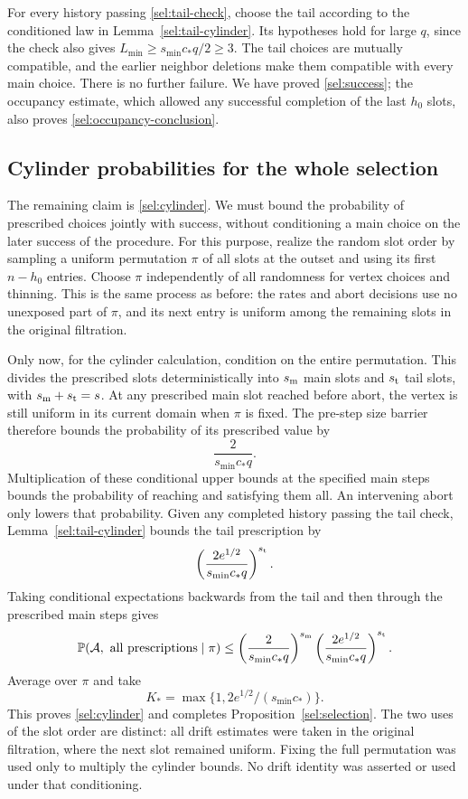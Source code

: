 For every history passing \eqref{sel:tail-check}, choose the tail
according to the conditioned law in Lemma~\ref{sel:tail-cylinder}.
Its hypotheses hold for large $q$, since the check also gives
$L_{\min}\ge s_{\min}c_*q/2\ge3$.  The tail choices are mutually
compatible, and the earlier neighbor deletions make them compatible
with every main choice.  There is no further failure.  We have proved
\eqref{sel:success}; the occupancy estimate, which allowed any
successful completion of the last $h_0$ slots, also proves
\eqref{sel:occupancy-conclusion}.

\subsection{Cylinder probabilities for the whole selection}

The remaining claim is \eqref{sel:cylinder}.  We must bound the
probability of prescribed choices jointly with success, without
conditioning a main choice on the later success of the procedure.
For this purpose, realize the random slot order by sampling a uniform
permutation $\pi$ of all slots at the outset and using its first
$n-h_0$ entries.  Choose $\pi$ independently of all randomness for
vertex choices and thinning.  This is the same process as before:
the rates and abort decisions use no unexposed part of $\pi$, and
its next entry is uniform among the remaining slots in the original
filtration.

Only now, for the cylinder calculation, condition on the entire
permutation.  This divides the prescribed slots deterministically into
$s_{\rm m}$ main slots and $s_{\rm t}$ tail slots, with
$s_{\rm m}+s_{\rm t}=s$.  At any prescribed main slot reached before
abort, the vertex is still uniform in its current domain when $\pi$
is fixed.  The pre-step size barrier therefore bounds the probability
of its prescribed value by
\[
 \frac{2}{s_{\min}c_*q}.
\]
Multiplication of these conditional upper bounds at the specified
main steps bounds the probability of reaching and satisfying them
all.  An intervening abort only lowers that probability.  Given
any completed history passing the tail check,
Lemma~\ref{sel:tail-cylinder} bounds the tail prescription by
\[
 \left(\frac{2e^{1/2}}{s_{\min}c_*q}\right)^{s_{\rm t}}.
\]
Taking conditional expectations backwards from the tail and then
through the prescribed main steps gives
\[
 \mathbb P(\mathcal A,\hbox{ all prescriptions}\mid\pi)
 \le\left(\frac{2}{s_{\min}c_*q}\right)^{s_{\rm m}}
      \left(\frac{2e^{1/2}}{s_{\min}c_*q}\right)^{s_{\rm t}}.
\]
Average over $\pi$ and take
\begin{equation}\label{sel:cylinder-constant}
 K_* =\max\{1,2e^{1/2}/(s_{\min}c_*)\}.
\end{equation}
This proves \eqref{sel:cylinder} and completes
Proposition~\ref{sel:selection}.  The two uses of the slot order are
distinct: all drift estimates were taken in the original filtration,
where the next slot remained uniform.  Fixing the full permutation
was used only to multiply the cylinder bounds.  No drift identity
was asserted or used under that conditioning.


